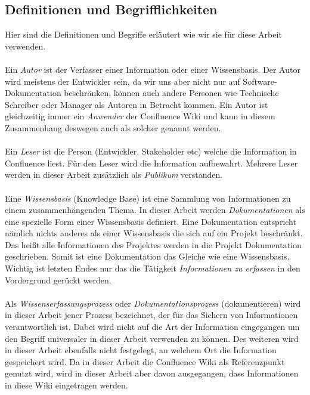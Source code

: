 \documentclass[a4paper,12pt]{scrartcl}
\begin{document}
\subsection{Definitionen und Begrifflichkeiten}
\label{Definitionen und Begrifflichkeiten}
Hier sind die Definitionen und Begriffe erläutert wie wir sie für diese Arbeit verwenden.
\\\\
Ein \textit{Autor} ist der Verfasser einer Information oder einer Wissensbasis. Der Autor wird meistens der Entwickler sein, da wir uns aber nicht nur auf Software-Dokumentation beschränken, können auch andere Personen wie Technische Schreiber oder Manager als Autoren in Betracht kommen. Ein Autor ist gleichzeitig immer ein \textit{Anwender} der Confluence Wiki und kann in diesem Zusammenhang deswegen auch als solcher genannt werden.
\\\\
Ein \textit{Leser} ist die Person (Entwickler, Stakeholder etc) welche die Information in Confluence liest. Für den Leser wird die Information aufbewahrt. Mehrere Leser werden in dieser Arbeit zusätzlich als \textit{Publikum} verstanden.
\\\\
Eine \textit{Wissensbasis} (Knowledge Base) ist eine Sammlung von Informationen zu einem zusammenhängenden Thema. In dieser Arbeit werden \textit{Dokumentationen} als eine spezielle Form einer Wissensbasis definiert. Eine Dokumentation entspricht nämlich nichts anderes als einer Wissensbasis die sich auf ein Projekt beschränkt. Das heißt alle Informationen des Projektes werden in die Projekt Dokumentation geschrieben. Somit ist eine Dokumentation das Gleiche wie eine Wissensbasis. Wichtig ist letzten Endes nur das die Tätigkeit \textit{Informationen zu erfassen} in den Vordergrund gerückt werden.   
\\\\
Als \textit{Wissenserfassungsprozess} oder \textit{Dokumentationsprozess} (dokumentieren) wird in dieser Arbeit jener Prozess bezeichnet, der für das Sichern von Informationen verantwortlich ist. Dabei wird nicht auf die Art der Information eingegangen um den Begriff universaler in dieser Arbeit verwenden zu können. Des weiteren wird in dieser Arbeit ebenfalls nicht festgelegt, an welchem Ort die Information gespeichert wird. Da in dieser Arbeit die Confluence Wiki als Referenzpunkt genutzt wird, wird in dieser Arbeit aber davon ausgegangen, dass Informationen in diese Wiki eingetragen werden.
\\\\
\end{document}
